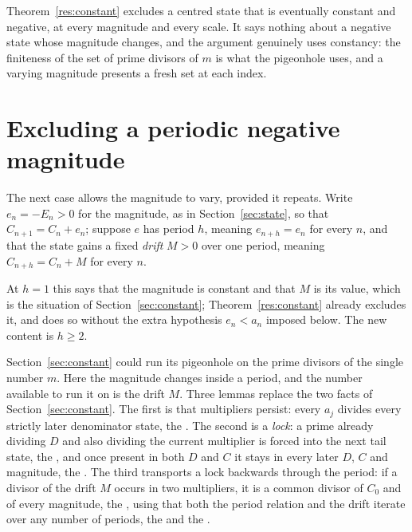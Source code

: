 Theorem~\ref{res:constant} excludes a centred state that is eventually constant
and negative, at every magnitude and every scale.  It says nothing about a
negative state whose magnitude changes, and the argument genuinely uses
constancy: the finiteness of the set of prime divisors of $m$ is what the
pigeonhole uses, and a varying magnitude presents a fresh set at each index.

\section{Excluding a periodic negative magnitude}\label{sec:periodic}

The next case allows the magnitude to vary, provided it repeats.  Write
$e_n=-E_n>0$ for the magnitude, as in Section~\ref{sec:state}, so that
$C_{n+1}=C_n+e_n$; suppose $e$ has period $h$, meaning $e_{n+h}=e_n$ for every
$n$, and that the state gains a fixed \emph{drift} $M>0$ over one period,
meaning $C_{n+h}=C_n+M$ for every $n$.

At $h=1$ this says that the magnitude is constant and that $M$ is its value,
which is the situation of Section~\ref{sec:constant};
Theorem~\ref{res:constant} already excludes it, and does so without the extra
hypothesis $e_n<a_n$ imposed below.  The new content is $h\ge2$.

Section~\ref{sec:constant} could run its pigeonhole on the prime divisors of
the single number $m$.  Here the magnitude changes inside a period, and the
number available to run it on is the drift $M$.  Three lemmas replace the two
facts of Section~\ref{sec:constant}.  The first is
that multipliers persist: every $a_j$ divides every strictly later denominator
state, the
.  The second is a \emph{lock}: a prime already dividing $D$ and also
dividing the current multiplier is forced into the next tail state, the
, and once present in both $D$ and $C$ it stays in every later $D$, $C$
and magnitude, the
.  The third transports a lock backwards through the period: if a
divisor of the drift $M$ occurs in two multipliers, it is a common divisor of
$C_0$ and of every magnitude, the
, using that both the period relation and the drift iterate over any
number of periods, the
 and the
.

